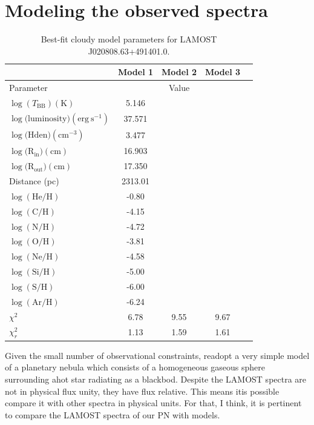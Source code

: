 \documentclass[fleqn,usenatbib]{mnras}
\begin{document}
{\section{Modeling the observed spectra}
\label{sec:model}

\begin{table}
	\centering
	\caption{Best-fit {\sc cloudy} model parameters for LAMOST J020808.63+491401.0.}
	\label{tab:example_table}
	\begin{tabular}{lcccc} %
                \hline
                & Model 1 &  Model 2 &  Model 3\\  
		\hline
		Parameter & & Value \\
                \hline
		$\log(T_{\mathrm{BB}}) (\mathrm{K})$  & 5.146 \\
		$\log(\mathrm{luminosity) (erg~s^{-1})}$ & 37.571 \\
		  $\log(\mathrm{Hden) (cm^{-3})} $ & 3.477 \\
                  $\log(\mathrm{R_{in}) (cm)}$ & 16.903 \\
                $\log(\mathrm{R_{out}) (cm)}$ & 17.350 \\
                 Distance (pc) & 2313.01 \\
                  $\log(\mathrm{He/H})$ & -0.80 \\
                $\log(\mathrm{C/H})$ & -4.15 \\
                $\log(\mathrm{N/H})$ & -4.72 \\
                $\log(\mathrm{O/H})$ & -3.81 \\
                $\log(\mathrm{Ne/H})$ & -4.58 \\
                $\log(\mathrm{Si/H})$ & -5.00 \\
                $\log(\mathrm{S/H})$ & -6.00 \\
                $\log(\mathrm{Ar/H})$ & -6.24 \\
                 \hline
                 $\chi^2$ & 6.78 &9.55& 9.67& \\
                 $\chi^2_r$ & 1.13 & 1.59&1.61& \\
                 
                \hline
	\end{tabular}
\end{table}

Given the small number of observational constraints, readopt a very
simple model of a planetary nebula which
consists of a homogeneous gaseous sphere surrounding ahot star radiating as a blackbod.
Despite the LAMOST spectra are not in physical flux unity, they have flux relative.
This means itis possible compare it with other spectra in physical units.
For that, I think, it is pertinent to
compare the LAMOST spectra of our PN with models.

}
\end{document}
